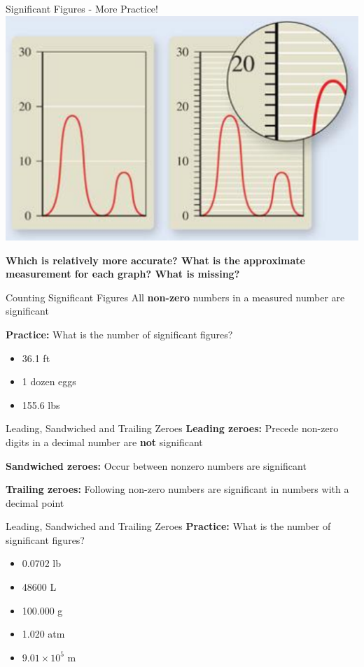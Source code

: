 \documentclass[11pt]{beamer}
\begin{document}
\begin{frame}{Significant Figures - More Practice!}
  \centering
  \includegraphics[scale=0.22]{graph_measure}

  \textbf{Which is relatively more accurate? What is the
    approximate measurement for each graph? What is missing?}
\end{frame}

\begin{frame}{Counting Significant Figures}
  All \textbf{non-zero} numbers in a measured number are
  significant

  \textbf{Practice:} What is the number of significant figures?
  \begin{itemize}
  \item 36.1 ft
  \item 1 dozen eggs
  \item 155.6 lbs
  \end{itemize}
\end{frame}

\begin{frame}{Leading, Sandwiched and Trailing Zeroes}
  \textbf{Leading zeroes:} Precede non-zero digits in a
  decimal number are \textbf{not} significant

  \textbf{Sandwiched zeroes:} Occur between nonzero numbers are significant
  
  \textbf{Trailing zeroes:} Following non-zero numbers are
  significant in numbers with a decimal point
\end{frame}

\begin{frame}{Leading, Sandwiched and Trailing Zeroes}
  \textbf{Practice:} What is the number of significant figures?
  \begin{itemize}
  \item 0.0702 lb
  \item 48600 L
  \item 100.000 g
  \item 1.020 atm
  \item $9.01 \times 10^5$ m
  \end{itemize}
\end{frame}
\end{document}
